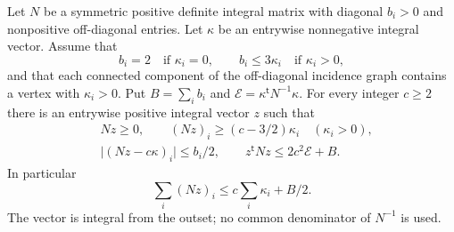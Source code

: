 \begin{lemma}
\label{D:integral-antinef-energy-cycle}
Let $N$ be a symmetric positive definite integral matrix with diagonal
$b_i>0$ and nonpositive off-diagonal entries. Let $\kappa$ be an
entrywise nonnegative integral vector. Assume that
\[
 b_i=2\quad\text{if }\kappa_i=0,
 \qquad b_i\le3\kappa_i\quad\text{if }\kappa_i>0,
                                                               \tag{D.IC.1}
\]
and that each connected component of the off-diagonal incidence graph
contains a vertex with $\kappa_i>0$. Put
$B=\sum_i b_i$ and $\mathcal E=\kappa^{\mathsf t}N^{-1}\kappa$.
For every integer $c\ge2$ there is an entrywise positive integral
vector $z$ such that
\[
 \begin{split}
 &Nz\ge0,\qquad
 (Nz)_i\ge(c-3/2)\kappa_i\quad(\kappa_i>0),\\
 &\bigl|(Nz-c\kappa)_i\bigr|\le b_i/2,\qquad
 z^{\mathsf t}Nz\le2c^2\mathcal E+B.
 \end{split}
 \tag{D.IC.2}
\]
In particular
\[
       \sum_i(Nz)_i\le c\sum_i\kappa_i+B/2.            \tag{D.IC.3}
\]
The vector is integral from the outset; no common denominator of
$N^{-1}$ is used.
\end{lemma}
